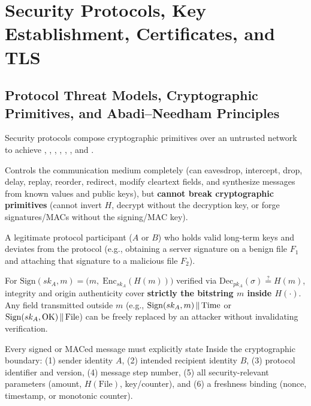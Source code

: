 \section{Security Protocols, Key Establishment, Certificates, and TLS}

\subsection{Protocol Threat Models, Cryptographic Primitives, and Abadi--Needham Principles}
Security protocols compose cryptographic primitives over an untrusted network to achieve , , , , , , and .
\begin{compactitem}
  \item {} Controls the communication medium completely (can eavesdrop, intercept, drop, delay, replay, reorder, redirect, modify cleartext fields, and synthesize messages from known values and public keys), but \textbf{cannot break cryptographic primitives} (cannot invert $H$, decrypt without the decryption key, or forge signatures/MACs without the signing/MAC key).
  \item {} A legitimate protocol participant ($A$ or $B$) who holds valid long-term keys and deviates from the protocol (e.g., obtaining a server signature on a benign file $F_1$ and attaching that signature to a malicious file $F_2$).
  \item {} For $\mathrm{Sign}(sk_A, m) = \big(m,\; \mathrm{Enc}_{sk_A}(H(m))\big)$ verified via $\mathrm{Dec}_{pk_A}(\sigma) \stackrel{?}{=} H(m)$, integrity and origin authenticity cover \textbf{strictly the bitstring $m$ inside $H(\cdot)$}. Any field transmitted outside $m$ (e.g., $\mathrm{Sign}(sk_A, m) \,\|\, \text{Time}$ or $\mathrm{Sign}(sk_A, \text{OK}) \,\|\, \text{File}$) can be freely replaced by an attacker without invalidating verification.
  \item {} Every signed or MACed message must explicitly state Inside the cryptographic boundary: (1) sender identity $A$, (2) intended recipient identity $B$, (3) protocol identifier and version, (4) message step number, (5) all security-relevant parameters (amount, $H(\text{File})$, key/counter), and (6) a freshness binding (nonce, timestamp, or monotonic counter).
\end{compactitem}

